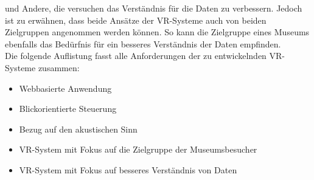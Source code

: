 \documentclass[a4paper,12pt,oneside]{article}
\begin{document}
      und Andere, die versuchen das Verständnis für die Daten zu verbessern. 
      Jedoch ist zu erwähnen, dass beide Ansätze der VR-Systeme auch von
      beiden Zielgruppen angenommen werden können. So kann die Zielgruppe eines Museums 
      ebenfalls das Bedürfnis für ein besseres Verständnis der Daten empfinden.\\
      Die folgende Auflistung fasst alle Anforderungen der zu entwickelnden 
      VR-Systeme zusammen: \\
      \begin{tcolorbox}[title={Die Anforderungen}]
          \begin{itemize}
          \item Webbasierte Anwendung
          \item Blickorientierte Steuerung
          \item Bezug auf den akustischen Sinn
          \item VR-System mit Fokus auf die Zielgruppe der Museumsbesucher
          \item VR-System mit Fokus auf besseres Verständnis von Daten
        \end{itemize}
      \end{tcolorbox}
\end{document}
